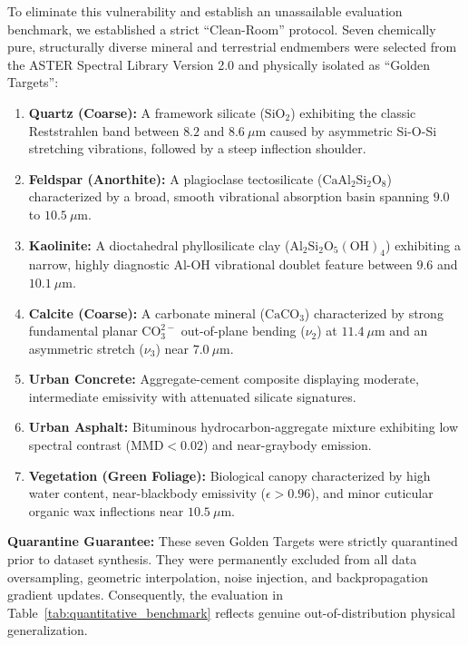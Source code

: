 \documentclass[journal]{IEEEtran}
\begin{document}
To eliminate this vulnerability and establish an unassailable evaluation benchmark, we established a strict ``Clean-Room'' protocol. Seven chemically pure, structurally diverse mineral and terrestrial endmembers were selected from the ASTER Spectral Library Version 2.0 \cite{baldridge2009aster, salisbury1992emissivity} and physically isolated as ``Golden Targets'':
\begin{enumerate}
    \item \textbf{Quartz (Coarse):} A framework silicate ($\text{SiO}_2$) exhibiting the classic Reststrahlen band between $8.2$ and $8.6\ \mu\text{m}$ caused by asymmetric Si-O-Si stretching vibrations, followed by a steep inflection shoulder.
    \item \textbf{Feldspar (Anorthite):} A plagioclase tectosilicate ($\text{CaAl}_2\text{Si}_2\text{O}_8$) characterized by a broad, smooth vibrational absorption basin spanning $9.0$ to $10.5\ \mu\text{m}$.
    \item \textbf{Kaolinite:} A dioctahedral phyllosilicate clay ($\text{Al}_2\text{Si}_2\text{O}_5(\text{OH})_4$) exhibiting a narrow, highly diagnostic Al-OH vibrational doublet feature between $9.6$ and $10.1\ \mu\text{m}$.
    \item \textbf{Calcite (Coarse):} A carbonate mineral ($\text{CaCO}_3$) characterized by strong fundamental planar $\text{CO}_3^{2-}$ out-of-plane bending ($\nu_2$) at $11.4\ \mu\text{m}$ and an asymmetric stretch ($\nu_3$) near $7.0\ \mu\text{m}$.
    \item \textbf{Urban Concrete:} Aggregate-cement composite displaying moderate, intermediate emissivity with attenuated silicate signatures.
    \item \textbf{Urban Asphalt:} Bituminous hydrocarbon-aggregate mixture exhibiting low spectral contrast ($\text{MMD} < 0.02$) and near-graybody emission.
    \item \textbf{Vegetation (Green Foliage):} Biological canopy characterized by high water content, near-blackbody emissivity ($\epsilon > 0.96$), and minor cuticular organic wax inflections near $10.5\ \mu\text{m}$.
\end{enumerate}

\textbf{Quarantine Guarantee:} These seven Golden Targets were strictly quarantined prior to dataset synthesis. They were permanently excluded from all data oversampling, geometric interpolation, noise injection, and backpropagation gradient updates. Consequently, the evaluation in Table~\ref{tab:quantitative_benchmark} reflects genuine out-of-distribution physical generalization.
\end{document}
